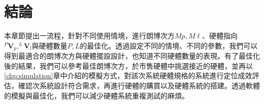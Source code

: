 

\section{結論}
\label{chp:5_conclu}

本章節提出一流程，針對不同使用情境，進行朗博次方$Mp,M\ell$、硬體指向$^{P}\boldsymbol{V}_p,^{L}\boldsymbol{V}_l$與硬體數量$P,L$的最佳化。透過設定不同的情境、不同的參數，我們可以得到最適合的朗博次方與硬體擺設設計，也知道不同硬體數量的表現。有了最佳化後的結果，我們可以參考最佳朗博次方，於市售硬體中挑選接近的硬體，並再以\ref{chp:simulation}章中介紹的模擬方式，對該次系統硬體規格的系統進行定位成效評估，確認次系統設計符合需求，再進行硬體的購買以及硬體系統的搭建。透過軟體的模擬與最佳化，我們可以減少硬體系統重複測試的麻煩。













